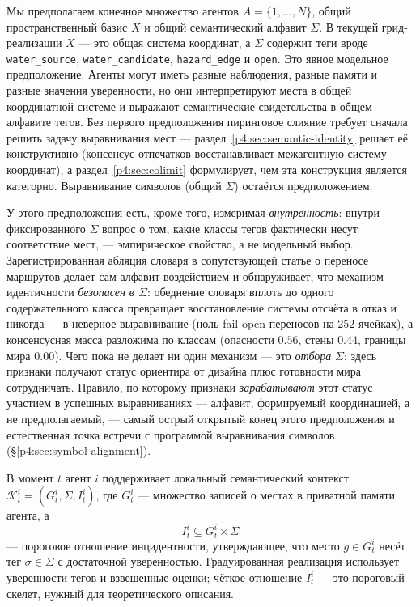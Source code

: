 \documentclass{article}
\begin{document}
Мы предполагаем конечное множество агентов $A=\{1,\ldots,N\}$, общий
пространственный базис $X$ и общий семантический алфавит $\Sigma$. В
текущей грид-реализации $X$ --- это общая система координат, а
$\Sigma$ содержит теги вроде \texttt{water\_source},
\texttt{water\_candidate}, \texttt{hazard\_edge} и \texttt{open}. Это
явное модельное предположение. Агенты могут иметь разные наблюдения,
разные памяти и разные значения уверенности, но они интерпретируют
места в общей координатной системе и выражают семантические
свидетельства в общем алфавите тегов. Без первого предположения
пиринговое слияние требует сначала решить задачу выравнивания мест ---
раздел~\ref{p4:sec:semantic-identity} решает её конструктивно (консенсус
отпечатков восстанавливает межагентную систему координат), а
раздел~\ref{p4:sec:colimit} формулирует, чем эта конструкция является
категорно. Выравнивание символов (общий $\Sigma$) остаётся
предположением.

У этого предположения есть, кроме того, измеримая \emph{внутренность}:
внутри фиксированного $\Sigma$ вопрос о том, какие классы тегов
фактически несут соответствие мест, --- эмпирическое свойство, а не
модельный выбор. Зарегистрированная абляция словаря в сопутствующей
статье о переносе маршрутов делает сам алфавит воздействием и
обнаруживает, что механизм идентичности \emph{безопасен в $\Sigma$}:
обеднение словаря вплоть до одного содержательного класса превращает
восстановление системы отсчёта в отказ и никогда --- в неверное
выравнивание (ноль fail-open переносов на $252$ ячейках), а
консенсусная масса разложима по классам (опасности $0.56$, стены
$0.44$, границы мира $0.00$). Чего пока не делает ни один механизм ---
это \emph{отбора} $\Sigma$: здесь признаки получают статус ориентира
от дизайна плюс готовности мира сотрудничать. Правило, по которому
признаки \emph{зарабатывают} этот статус участием в успешных
выравниваниях --- алфавит, формируемый координацией, а не
предполагаемый, --- самый острый открытый конец этого предположения и
естественная точка встречи с программой выравнивания символов
(\S\ref{p4:sec:symbol-alignment}).

В момент $t$ агент $i$ поддерживает локальный семантический контекст
$\mathcal{K}_t^i=(G_t^i,\Sigma,I_t^i)$, где $G_t^i$ --- множество
записей о местах в приватной памяти агента, а
\[
I_t^i \subseteq G_t^i \times \Sigma
\]
--- пороговое отношение инцидентности, утверждающее, что место $g\in
G_t^i$ несёт тег $\sigma\in\Sigma$ с достаточной уверенностью.
Градуированная реализация использует уверенности тегов и взвешенные
оценки; чёткое отношение $I_t^i$ --- это пороговый скелет, нужный для
теоретического описания.
\end{document}
